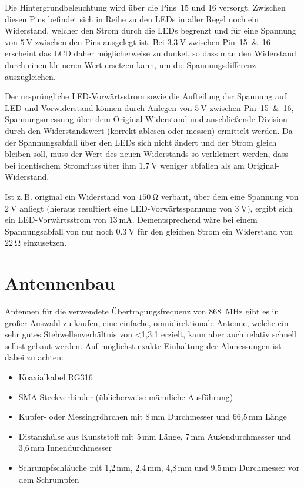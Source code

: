 \documentclass[paper=a4, parskip, numbers=noenddot, toc=listof, headsepline]{scrbook}
\begin{document}
				Die Hintergrundbeleuchtung wird über die Pins~15 und 16 versorgt. Zwischen diesen Pins befindet sich in Reihe zu den LEDs in aller Regel noch ein Widerstand, welcher den Strom durch die LEDs begrenzt und für eine Spannung von $\SI{5}{\volt}$ zwischen den Pins ausgelegt ist. Bei $\SI{3,3}{\volt}$ zwischen Pin~15~\&~16 erscheint das LCD daher möglicherweise zu dunkel, so dass man den Widerstand durch einen kleineren Wert ersetzen kann, um die Spannungsdifferenz auszugleichen.

				Der ursprüngliche LED-Vorwärtsstrom sowie die Aufteilung der Spannung auf LED und Vorwiderstand können durch Anlegen von $\SI{5}{\volt}$ zwischen Pin~15~\&~16, Spannungsmessung über dem Original-Widerstand und anschließende Division durch den Widerstandswert (korrekt ablesen oder messen) ermittelt werden. Da der Spannungsabfall über den LEDs sich nicht ändert und der Strom gleich bleiben soll, muss der Wert des neuen Widerstands so verkleinert werden, dass bei identischem Stromfluss über ihm $\SI{1,7}{\volt}$ weniger abfallen als am Original-Widerstand.

				Ist z.\,B. original ein Widerstand von $\SI{150}{\ohm}$ verbaut, über dem eine Spannung von $\SI{2}{\volt}$ anliegt (hieraus resultiert eine LED-Vorwärtsspannung von $\SI{3}{\volt}$), ergibt sich ein LED-Vorwärtsstrom von $\SI{13}{\milli\ampere}$. Dementsprechend wäre bei einem Spannungsabfall von nur noch $\SI{0,3}{\volt}$ für den gleichen Strom ein Widerstand von $\SI{22}{\ohm}$ einzusetzen.

			\section{Antennenbau}

				Antennen für die verwendete Übertragungsfrequenz von \SI{868}{\mega\hertz} gibt es in großer Auswahl zu kaufen, eine einfache, omnidirektionale Antenne, welche ein sehr gutes Stehwellenverhältnis von <1,3:1 erzielt, kann aber auch relativ schnell selbst gebaut werden. Auf möglichst exakte Einhaltung der Abmessungen ist dabei zu achten:
				\begin{itemize}
					\item Koaxialkabel RG316
					\item SMA-Steckverbinder (üblicherweise männliche Ausführung)
					\item Kupfer- oder Messingröhrchen mit 8\,mm Durchmesser und 66,5\,mm Länge
					\item Distanzhülse aus Kunststoff mit 5\,mm Länge, 7\,mm Außendurchmesser und 3,6\,mm Innendurchmesser
					\item Schrumpfschläuche mit 1,2\,mm, 2,4\,mm, 4,8\,mm und 9,5\,mm Durchmesser vor dem Schrumpfen
				\end{itemize}
\end{document}
